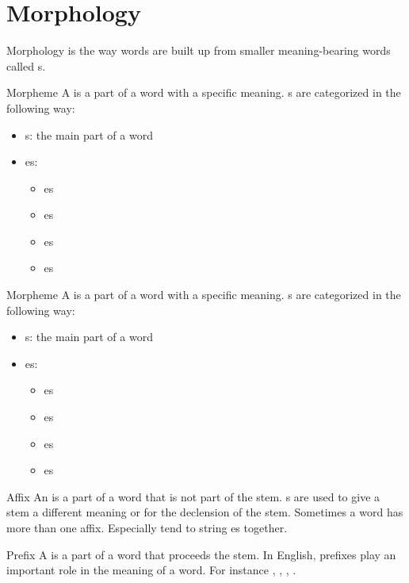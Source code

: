 \section{Morphology}
\begin{df}{Morphology}
\sb{} is the way words are built up from smaller meaning-bearing words called s.
\end{df}
\begin{df}{Morpheme}
A \sb{} is a part of a word with a specific meaning. \sb{}s are categorized in the following way:
\begin{itemize}
 \item {}s: the main part of a word
 \item {}es:
 \begin{itemize}
  \item {}es
  \item {}es
  \item {}es
  \item {}es
 \end{itemize}
\end{itemize}
\end{df}
\begin{df}{Morpheme}
A \sb{} is a part of a word with a specific meaning. \sb{}s are categorized in the following way:
\begin{itemize}
 \item {}s: the main part of a word
 \item {}es:
 \begin{itemize}
  \item {}es
  \item {}es
  \item {}es
  \item {}es
 \end{itemize}
\end{itemize}
\end{df}
\begin{df}{Affix}
An \sb{} is a part of a word that is not part of the stem. \sb{}s are used to give a stem a different meaning or for the declension of the stem. Sometimes a word has more than one affix. Especially  tend to string \sb{}es together.
\end{df}
\begin{df}{Prefix}
A \sb{} is a part of a word that proceeds the stem. In English, prefixes play an important role in the meaning of a word. For instance , , , .
\end{df}
